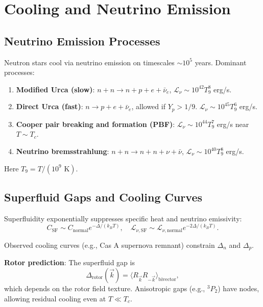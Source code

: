 \documentclass[12pt,a4paper]{article}
\theoremstyle{definition}
\theoremstyle{remark}
\begin{document}
\section{Cooling and Neutrino Emission}

\subsection{Neutrino Emission Processes}

Neutron stars cool via neutrino emission on timescales $\sim 10^5$ years. Dominant processes:

\begin{enumerate}
\item \textbf{Modified Urca (slow)}: $n + n \to n + p + e + \bar{\nu}_e$, $\mathcal{L}_{\nu} \sim 10^{42} T_9^8$ erg/s.
\item \textbf{Direct Urca (fast)}: $n \to p + e + \bar{\nu}_e$, allowed if $Y_p > 1/9$. $\mathcal{L}_{\nu} \sim 10^{45} T_9^6$ erg/s.
\item \textbf{Cooper pair breaking and formation (PBF)}: $\mathcal{L}_{\nu} \sim 10^{44} T_9^7$ erg/s near $T \sim T_c$.
\item \textbf{Neutrino bremsstrahlung}: $n + n \to n + n + \nu + \bar{\nu}$, $\mathcal{L}_{\nu} \sim 10^{40} T_9^8$ erg/s.
\end{enumerate}

Here $T_9 = T/(10^9 \text{ K})$.

\subsection{Superfluid Gaps and Cooling Curves}

Superfluidity exponentially suppresses specific heat and neutrino emissivity:
\begin{equation}
C_{\text{SF}} \sim C_{\text{normal}} e^{-\Delta/(k_B T)}, \quad \mathcal{L}_{\nu,\text{SF}} \sim \mathcal{L}_{\nu,\text{normal}} e^{-2\Delta/(k_B T)}.
\end{equation}

Observed cooling curves (e.g., Cas A supernova remnant) constrain $\Delta_n$ and $\Delta_p$.

\textbf{Rotor prediction}: The superfluid gap is
\begin{equation}
\Delta_{\text{rotor}}(\vec{k}) = \langle R_{\vec{k}} R_{-\vec{k}} \rangle_{\text{bivector}},
\end{equation}
which depends on the rotor field texture. Anisotropic gaps (e.g., $^3P_2$) have nodes, allowing residual cooling even at $T \ll T_c$.
\end{document}
